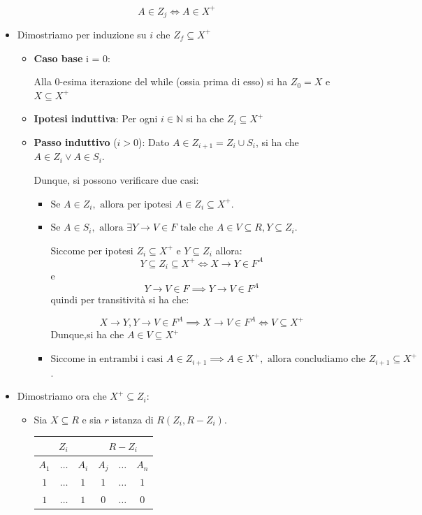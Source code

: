 \documentclass{article}
\begin{document}
\[A \in Z_{j} \Leftrightarrow A \in X^{+} \]
\begin{itemize}
  \item Dimostriamo per induzione su $i$ che $Z_{f} \subseteq X^{+}$
  \begin{itemize}
    \item \textbf{Caso base} i = 0:\par 
    Alla $0$-esima iterazione del while (ossia prima di esso) si ha $Z_{0} = X$ e $X \subseteq X^{+}$

    \item \textbf{Ipotesi induttiva}: Per ogni $i \in\mathbb{N}$ si ha che $Z_i \subseteq X^+$

    \item \textbf{Passo induttivo} ($i > 0$):
    Dato $A \in Z_{i+1} = Z_i \cup S_i$, si ha che $A \in Z_i \lor A \in S_i$. \par 
    Dunque, si possono verificare due casi:
    \begin{itemize}
      \item $\text{Se } A \in Z_i, \text{ allora per ipotesi } A \in Z_i \subseteq X^+.$
      \item $\text{Se } A \in S_i, \text{ allora } \exists Y \rightarrow V \in F \text{ tale che } A \in V \subseteq R, Y \subseteq Z_i.$\par
      Siccome per ipotesi  $Z_i \subseteq X^+ \text{ e } Y \subseteq Z_i$ allora: 
      \[Y \subseteq Z_i \subseteq X^+ \iff X \rightarrow Y \in F^A\] e 
      \[Y \rightarrow V \in F \implies Y \rightarrow V \in F^A\] 
      quindi per transitività si ha che:

      \[X \rightarrow Y, Y \rightarrow V \in F^A \implies X \rightarrow V \in F^A \iff V \subseteq X^+\]
      Dunque,si ha che $A \in V \subseteq X^+$
      \item $\text{Siccome in entrambi i casi } A \in Z_{i+1} \implies A \in X^+, \text{ allora concludiamo che } Z_{i+1} \subseteq X^+$.

    \end{itemize}
    
  \end{itemize}
  \pagebreak
  \item Dimostriamo ora che $X^{+} \subseteq Z_{i}$:\par
  \begin{itemize}
    \item Sia $X \subseteq R$ e sia $r$ istanza di $R(Z_{i}, R-Z_{i})$. 
    \begin{table}[ht]
      \centering
      \begin{tabular}{|c|c|c|c|c|c|}
      \hline
      \multicolumn{3}{|c|}{$Z_{i}$} & \multicolumn{3}{c|}{$R - Z_{i}$} \\
      \hline
      $A_1$ & $\dots$ & $A_{i}$ & $A_{j}$ & $\dots$  & $A_{n}$ \\
      \hline
      $1$ & $\dots$ & $1$ & $1$ & $\dots$  & $1$ \\
      \hline
      $1$ & $\dots$ & $1$ & $0$ & $\dots$  & $0$ \\
      \hline
      \end{tabular}
  \end{table}


\end{itemize}
\end{itemize}
\end{document}
